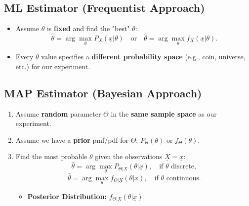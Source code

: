 \subsection{ML Estimator (Frequentist Approach)}
\begin{definition}
    \begin{itemize}
        \item Assume $\theta$ is \textbf{fixed} and find the "best" $\theta$:
        \[
        \hat{\theta} = \arg\max_{\theta} P_{\underline{X}}(\underline{x}|\theta) \quad \text{or} \quad \hat{\theta} = \arg\max_{\theta} f_{\underline{X}}(\underline{x}|\theta).
        \]
        \item Every $\theta$ value specifies a \textbf{different probability space} (e.g., coin, universe, etc.) for our experiment.
    \end{itemize}
\end{definition}

\subsection{MAP Estimator (Bayesian Approach)}
\begin{definition}
    \begin{enumerate}
        \item Assume \textbf{random} parameter $\Theta$ in the \textbf{same sample space} as our experiment.
        \item Assume we have a \textbf{prior} pmf/pdf for $\Theta$: $P_\Theta(\theta)$ or $f_\Theta(\theta)$.
        \item Find the most probable $\theta$ given the observations $\underline{X} = \underline{x}$:
        \[
        \hat{\theta} = \arg\max_{\theta} P_{\Theta|\underline{X}}(\theta|\underline{x}), \quad \text{if } \theta \text{ discrete},
        \]
        \[
        \hat{\theta} = \arg\max_{\theta} f_{\Theta|\underline{X}}(\theta|\underline{x}), \quad \text{if } \theta \text{ continuous}.
        \]
        \begin{itemize}
            \item \textbf{Posterior Distribution:} $f_{\Theta|\underline{X}} (\theta|\underline{x})$.
        \end{itemize}
    \end{enumerate}
\end{definition}

